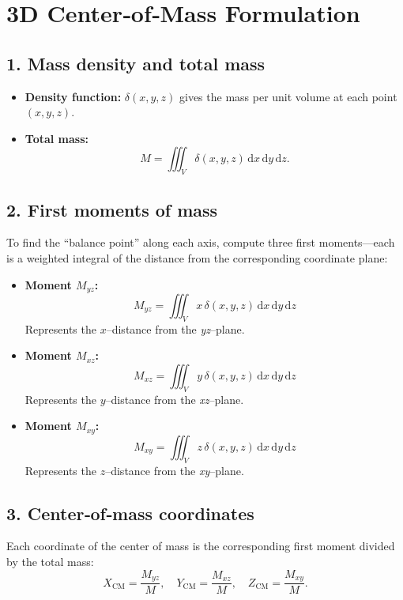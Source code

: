 \newpage


\section*{3D Center‐of‐Mass Formulation}

\subsection*{1. Mass density and total mass}
\begin{itemize}
  \item \textbf{Density function:} $\delta(x,y,z)$ gives the mass per unit volume at each point $(x,y,z)$.
  \item \textbf{Total mass:}
    \[
      M = \iiint_V \delta(x,y,z)\,\mathrm{d}x\,\mathrm{d}y\,\mathrm{d}z.
    \]
\end{itemize}

\subsection*{2. First moments of mass}
To find the “balance point” along each axis, compute three first moments—each is a weighted integral of the distance from the corresponding coordinate plane:

\begin{itemize}
    \item \textbf{Moment $M_{yz}$:} 
        \[
            M_{yz} = \iiint_V x\,\delta(x,y,z)\,\mathrm{d}x\,\mathrm{d}y\,\mathrm{d}z
        \]
        Represents the $x$–distance from the \emph{yz}–plane.
    \item \textbf{Moment $M_{xz}$:} 
        \[
            M_{xz} = \iiint_V y\,\delta(x,y,z)\,\mathrm{d}x\,\mathrm{d}y\,\mathrm{d}z
        \]
        Represents the $y$–distance from the \emph{xz}–plane.
    \item \textbf{Moment $M_{xy}$:} 
        \[
            M_{xy} = \iiint_V z\,\delta(x,y,z)\,\mathrm{d}x\,\mathrm{d}y\,\mathrm{d}z
        \]
        Represents the $z$–distance from the \emph{xy}–plane.
\end{itemize}

\subsection*{3. Center‐of‐mass coordinates}
Each coordinate of the center of mass is the corresponding first moment divided by the total mass:
\[
  X_{\mathrm{CM}} = \frac{M_{yz}}{M}, 
  \quad
  Y_{\mathrm{CM}} = \frac{M_{xz}}{M}, 
  \quad
  Z_{\mathrm{CM}} = \frac{M_{xy}}{M}.
\]

